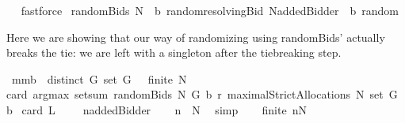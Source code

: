\begin{isabellebody}
\isadelimproof
\ %
\endisadelimproof
%
\isatagproof
{}\isamarkupfalse%
\ fastforce%
\endisatagproof
{\isafoldproof}%
%
\isadelimproof
%
\endisadelimproof
\isanewline
\isanewline
{}\isamarkupfalse%
\ {\isachardoublequoteopen}randomBids{\isacharprime}\ N\ {\isasymOmega}\ b\ random{\isacharequal}{\isacharequal}resolvingBid{\isacharprime}\ {\isacharparenleft}N{\isasymunion}{\isacharbraceleft}addedBidder{\isacharprime}{\isacharbraceright}{\isacharparenright}\ {\isasymOmega}\ b\ random{\isachardoublequoteclose}%
\begin{isamarkuptext}%
Here we are showing that our way of randomizing using randomBids' actually breaks the tie:
we are left with a singleton after the tiebreaking step.%
\end{isamarkuptext}%
\isamarkuptrue%
\isamarkupfalse%
\ mm{}{}b{\isacharcolon}\ \ {\isachardoublequoteopen}distinct\ G{\isachardoublequoteclose}\ {\isachardoublequoteopen}set\ G\ {\isasymnoteq}\ {\isacharbraceleft}{\isacharbraceright}{\isachardoublequoteclose}\ {\isachardoublequoteopen}finite\ N{\isachardoublequoteclose}\ \ \isanewline
{\isachardoublequoteopen}card\ {\isacharparenleft}argmax\ {\isacharparenleft}setsum\ {\isacharparenleft}randomBids{\isacharprime}\ N\ G\ b\ r{\isacharparenright}{\isacharparenright}\ {\isacharparenleft}maximalStrictAllocations{\isacharprime}\ N\ {\isacharparenleft}set\ G{\isacharparenright}\ b{\isacharparenright}{\isacharparenright}{\isacharequal}{}{\isachardoublequoteclose}\isanewline
{\isacharparenleft}\ {\isachardoublequoteopen}card\ {\isacharquery}L{\isacharequal}{\isacharunderscore}{\isachardoublequoteclose}{\isacharparenright}%
\isadelimproof
\ %
\endisadelimproof
%
\isatagproof
{}\isamarkupfalse%
\ {\isacharminus}\isanewline
{}\isamarkupfalse%
\ {\isacharquery}n{\isacharequal}{\isachardoublequoteopen}{\isacharbraceleft}addedBidder{\isacharprime}{\isacharbraceright}{\isachardoublequoteclose}\ \isamarkupfalse%
\ \isanewline
{}{\isacharcolon}\ {\isachardoublequoteopen}{\isacharparenleft}{\isacharquery}n\ {\isasymunion}\ N{\isacharparenright}{\isasymnoteq}{\isacharbraceleft}{\isacharbraceright}{\isachardoublequoteclose}\ \isamarkupfalse%
\ simp\ \isamarkupfalse%
\ \isanewline
{}{\isacharcolon}\ {\isachardoublequoteopen}finite\ {\isacharparenleft}{\isacharquery}n{\isasymunion}N{\isacharparenright}{\isachardoublequoteclose}\ \isamarkupfalse%

\end{isabellebody}
